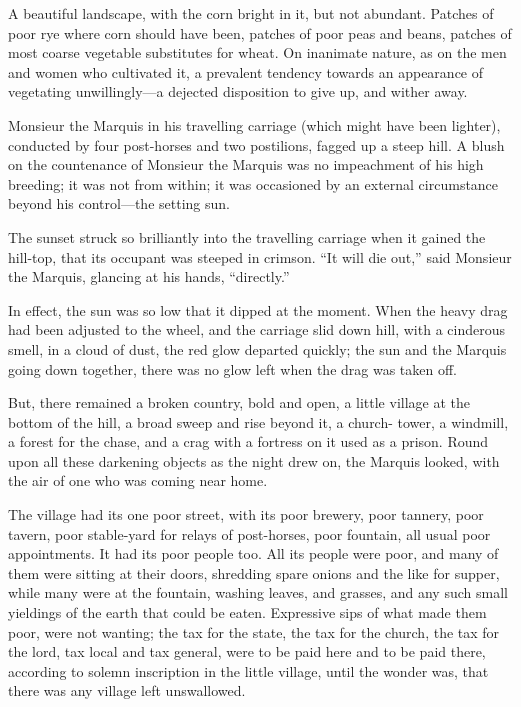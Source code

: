 A beautiful landscape, with the corn bright in it, but not abundant.
Patches of poor rye where corn should have been, patches of poor peas
and beans, patches of most coarse vegetable substitutes for wheat.
On inanimate nature, as on the men and women who cultivated it,
a prevalent tendency towards an appearance of vegetating
unwillingly---a dejected disposition to give up, and wither away.

Monsieur the Marquis in his travelling carriage (which might have
been lighter), conducted by four post-horses and two postilions,
fagged up a steep hill.  A blush on the countenance of Monsieur the
Marquis was no impeachment of his high breeding; it was not from
within; it was occasioned by an external circumstance beyond his
control---the setting sun.

The sunset struck so brilliantly into the travelling carriage when it
gained the hill-top, that its occupant was steeped in crimson.
``It will die out,'' said Monsieur the Marquis, glancing at his hands,
``directly.''

In effect, the sun was so low that it dipped at the moment.  When the
heavy drag had been adjusted to the wheel, and the carriage slid down
hill, with a cinderous smell, in a cloud of dust, the red glow departed
quickly; the sun and the Marquis going down together, there was no
glow left when the drag was taken off.

But, there remained a broken country, bold and open, a little village
at the bottom of the hill, a broad sweep and rise beyond it, a church-%
tower, a windmill, a forest for the chase, and a crag with a fortress
on it used as a prison.  Round upon all these darkening objects as
the night drew on, the Marquis looked, with the air of one who was
coming near home.

The village had its one poor street, with its poor brewery, poor
tannery, poor tavern, poor stable-yard for relays of post-horses,
poor fountain, all usual poor appointments.  It had its poor people
too.  All its people were poor, and many of them were sitting at
their doors, shredding spare onions and the like for supper, while
many were at the fountain, washing leaves, and grasses, and any such
small yieldings of the earth that could be eaten.  Expressive sips of
what made them poor, were not wanting; the tax for the state, the tax
for the church, the tax for the lord, tax local and tax general, were
to be paid here and to be paid there, according to solemn inscription
in the little village, until the wonder was, that there was any
village left unswallowed.

